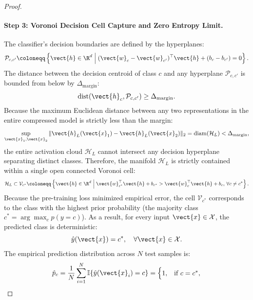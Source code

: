 \begin{proof}
\paragraph{Step 3: Voronoi Decision Cell Capture and Zero Entropy Limit.}
The classifier's decision boundaries are defined by the hyperplanes:
\begin{equation}
\mathcal{P}_{c, c'} \coloneqq \left\{ \vect{h} \in \R^d \;\middle|\; (\vect{w}_c - \vect{w}_{c'})^\top \vect{h} + (b_c - b_{c'}) = 0 \right\}.
\end{equation}
The distance between the decision centroid of class $c$ and any hyperplane $\mathcal{P}_{c, c'}$ is bounded from below by $\Delta_{\text{margin}}$:
\begin{equation}
\operatorname{dist}(\vect{h}_c, \mathcal{P}_{c, c'}) \ge \Delta_{\text{margin}}.
\end{equation}
Because the maximum Euclidean distance between any two representations in the entire compressed model is strictly less than the margin:
\begin{equation}
\sup_{\vect{x}_1, \vect{x}_2} \|\vect{h}_L(\vect{x}_1) - \vect{h}_L(\vect{x}_2)\|_2 = \operatorname{diam}(\mathcal{H}_L) < \Delta_{\text{margin}},
\end{equation}
the entire activation cloud $\mathcal{H}_L$ cannot intersect any decision hyperplane separating distinct classes.
Therefore, the manifold $\mathcal{H}_L$ is strictly contained within a single open connected Voronoi cell:
\begin{equation}
\mathcal{H}_L \subset \mathcal{V}_{c^*} \coloneqq \left\{ \vect{h} \in \R^d \;\middle|\; \vect{w}_{c^*}^\top \vect{h} + b_{c^*} > \vect{w}_c^\top \vect{h} + b_c, \, \forall c \ne c^* \right\}.
\end{equation}
Because the pre-training loss minimized empirical error, the cell $\mathcal{V}_{c^*}$ corresponds to the class with the highest prior probability (the majority class $c^* = \arg\max_c p(y=c)$).
As a result, for every input $\vect{x} \in \mathcal{X}$, the predicted class is deterministic:
\begin{equation}
\hat{y}(\vect{x}) = c^*, \quad \forall \vect{x} \in \mathcal{X}.
\end{equation}
The empirical prediction distribution across $N$ test samples is:
\begin{equation}
\hat{p}_c = \frac{1}{N} \sum_{i=1}^N \mathbb{I}\{\hat{y}(\vect{x}_i) = c\} = \begin{cases}
1, & \text{if } c = c^*, \\

\end{cases}
\end{equation}
\end{proof}
